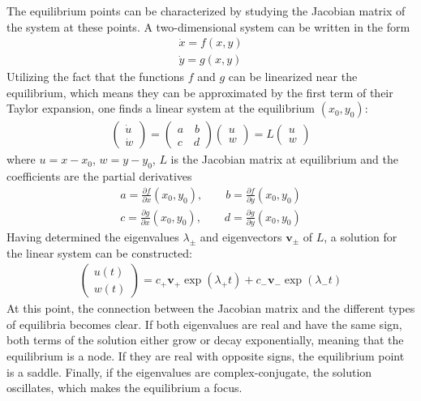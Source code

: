 \documentclass[12pt,a4paper]{article}
\begin{document}
The equilibrium points can be characterized by studying the Jacobian matrix of the system at these points. A two-dimensional system can be written in the form
\begin{align}
\dot{x}=f(x,y)\\
\dot{y}=g(x,y)
\end{align}
Utilizing the fact that the functions $f$ and $g$ can be linearized near the equilibrium, which means they can be approximated by the first term of their Taylor expansion, one finds a linear system at the equilibrium $(x_0,y_0)$:
\begin{align}				
\left(\begin{matrix}\dot{u}\\\dot{w}
\end{matrix}\right)
=\left(\begin{matrix}a\quad b\\
c\quad d\end{matrix}\right)\left(\begin{matrix}u\\w\end{matrix}\right)=L\left(\begin{matrix}u\\w\end{matrix}\right)
\end{align}
where $u=x-x_0$, $w=y-y_0$, $L$ is the Jacobian matrix at equilibrium and the coefficients are the partial derivatives
\begin{align}
a=\frac{\partial f}{\partial x}(x_0,y_0),\qquad b=\frac{\partial f}{\partial y}(x_0,y_0) \\
c=\frac{\partial g}{\partial x}(x_0,y_0),\qquad d=\frac{\partial g}{\partial y}(x_0,y_0)
\end{align} 
Having determined the eigenvalues $\lambda_\pm$ and eigenvectors $ \boldsymbol{v_\pm}$ of $L$, a solution for the linear system can be constructed:
\begin{align}
\left(\begin{matrix}u(t)\\w(t)
\end{matrix}\right)=c_+\boldsymbol{v_+}\exp(\lambda_+t)+c_-\boldsymbol{v_-}\exp(\lambda_-t)
\end{align}
At this point, the connection between the Jacobian matrix and the different types of equilibria becomes clear. If both eigenvalues are real and have the same sign, both terms of the solution either grow or decay exponentially, meaning that the equilibrium is a node. If they are real with opposite signs, the equilibrium point is a saddle. Finally, if the eigenvalues are complex-conjugate, the solution oscillates, which makes the equilibrium a focus\cite{izi}.\\
\end{document}
